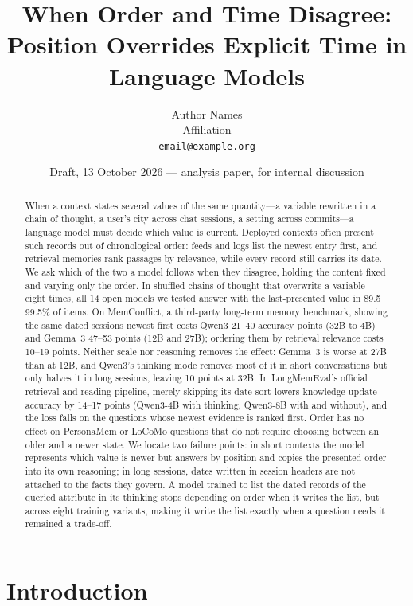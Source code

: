 \documentclass[11pt]{article}
\title{When Order and Time Disagree:\\Position Overrides Explicit Time in Language Models}
\author{Author Names\\\small Affiliation\\\small\texttt{email@example.org}}
\date{Draft, 13 October 2026 --- analysis paper, for internal discussion}
\begin{document}
\maketitle

\begin{abstract}
When a context states several values of the same quantity---a variable rewritten in a chain of thought, a user's city across chat sessions, a setting across commits---a language model must decide which value is current.
Deployed contexts often present such records out of chronological order: feeds and logs list the newest entry first, and retrieval memories rank passages by relevance, while every record still carries its date.
We ask which of the two a model follows when they disagree, holding the content fixed and varying only the order.
In shuffled chains of thought that overwrite a variable eight times, all 14 open models we tested answer with the last-presented value in 89.5--99.5\% of items.
On MemConflict, a third-party long-term memory benchmark, showing the same dated sessions newest first costs Qwen3 21--40 accuracy points (32B to 4B) and Gemma~3 47--53 points (12B and 27B); ordering them by retrieval relevance costs 10--19 points.
Neither scale nor reasoning removes the effect: Gemma~3 is worse at 27B than at 12B, and Qwen3's thinking mode removes most of it in short conversations but only halves it in long sessions, leaving 10 points at 32B.
In LongMemEval's official retrieval-and-reading pipeline, merely skipping its date sort lowers knowledge-update accuracy by 14--17 points (Qwen3-4B with thinking, Qwen3-8B with and without), and the loss falls on the questions whose newest evidence is ranked first.
Order has no effect on PersonaMem or LoCoMo questions that do not require choosing between an older and a newer state.
We locate two failure points: in short contexts the model represents which value is newer but answers by position and copies the presented order into its own reasoning; in long sessions, dates written in session headers are not attached to the facts they govern.
A model trained to list the dated records of the queried attribute in its thinking stops depending on order when it writes the list, but across eight training variants, making it write the list exactly when a question needs it remained a trade-off.
\end{abstract}

\section{Introduction}
\end{document}
